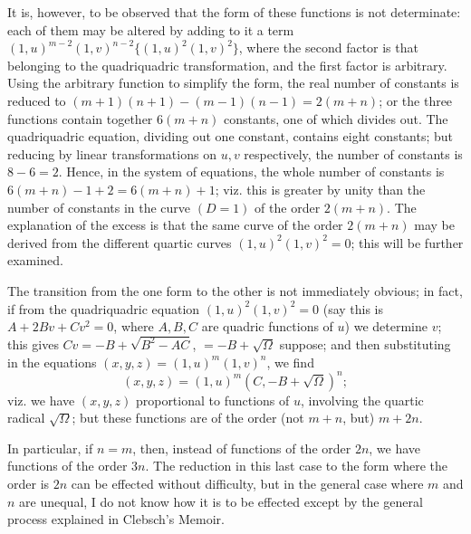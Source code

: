 \documentclass[11pt,a4paper]{article}
\begin{document}
It is, however, to be observed that the form of these functions is not determinate: each of
them may be altered by adding to it a term
$(1,u)^{m-2}(1,v)^{n-2}\{(1,u)^2(1,v)^2\}$, where the second factor is that belonging to the
quadriquadric transformation, and the first factor is arbitrary. Using the arbitrary function
to simplify the form, the real number of constants is reduced to
$(m+1)(n+1)-(m-1)(n-1)=2(m+n)$; or the three functions contain together $6(m+n)$ constants,
one of which divides out. The quadriquadric equation, dividing out one constant, contains
eight constants; but reducing by linear transformations on $u,v$ respectively, the number of
constants is $8-6=2$. Hence, in the system of equations, the whole number of constants is
$6(m+n)-1+2=6(m+n)+1$; viz. this is greater by unity than the number of constants in the
curve $(D=1)$ of the order $2(m+n)$. The explanation of the excess is that the same curve of
the order $2(m+n)$ may be derived from the different quartic curves
$(1,u)^2(1,v)^2=0$; this will be further examined.

The transition from the one form to the other is not immediately obvious; in fact, if from
the quadriquadric equation $(1,u)^2(1,v)^2=0$ (say this is
$A+2Bv+Cv^2=0$, where $A,B,C$ are quadric functions of $u$) we determine $v$; this gives
$Cv=-B+\sqrt{B^2-AC}$, $=-B+\sqrt\Omega$ suppose; and then substituting in the equations
$(x,y,z)=(1,u)^m(1,v)^n$, we find
\[
 (x,y,z)=(1,u)^m(C,-B+\sqrt\Omega)^n;
\]
viz. we have $(x,y,z)$ proportional to functions of $u$, involving the quartic radical
$\sqrt\Omega$; but these functions are of the order (not $m+n$, but) $m+2n$.

In particular, if $n=m$, then, instead of functions of the order $2n$, we have functions
of the order $3n$. The reduction in this last case to the form where the order is $2n$ can
be effected without difficulty, but in the general case where $m$ and $n$ are unequal, I do
not know how it is to be effected except by the general process explained in Clebsch's
Memoir.
\end{document}
